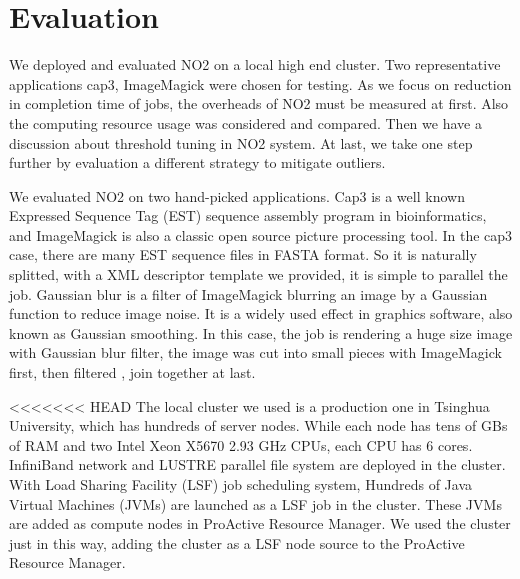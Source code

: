 \section{Evaluation}
We deployed and evaluated NO2 on a local high end cluster. Two representative applications cap3, ImageMagick were chosen for testing. As we focus on reduction in completion time of jobs, the overheads of NO2 must be measured at first. Also the computing resource usage was considered and compared. Then we have a discussion about threshold tuning in NO2 system. At last, we take one step further by evaluation a different strategy to mitigate outliers.

We evaluated NO2 on two hand-picked applications. Cap3 is a well known Expressed Sequence Tag (EST) sequence assembly program in bioinformatics, and ImageMagick is also a classic open source picture processing tool. In the cap3 case, there are many EST sequence files in FASTA format. So it is naturally splitted, with a XML descriptor template we provided, it is simple to parallel the job. Gaussian blur is a filter of ImageMagick blurring an image by a Gaussian function to reduce image noise. It is a widely used effect in graphics software, also known as Gaussian smoothing. In this case, the job is rendering a huge size image with Gaussian blur filter, the image was cut into small pieces with ImageMagick first, then filtered , join together at last. 

<<<<<<< HEAD
The local cluster we used is a production one in Tsinghua University, which has hundreds of  server nodes. While each node has tens of GBs of RAM and two Intel Xeon X5670 2.93 GHz CPUs, each CPU has 6 cores. InfiniBand network and LUSTRE parallel file system are deployed in the cluster. With Load Sharing Facility (LSF) job scheduling system, Hundreds of Java Virtual Machines (JVMs) are launched as a LSF job in the cluster. These JVMs are added as compute nodes in ProActive Resource Manager. We used the cluster just in this way, adding the cluster as a LSF node source to the ProActive Resource Manager.

